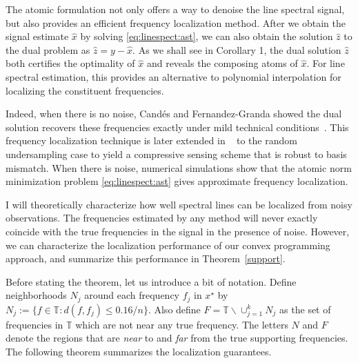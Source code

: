 The atomic formulation not only offers a way to denoise the line spectral
signal, but also provides an efficient frequency localization method. After we
obtain the signal estimate $\hat{x}$ by solving \eqref{eq:linespect:ast}, we can
also obtain the solution $\hat{z}$ to the dual problem as $\hat{z} = y -
\hat{x}$. As we shall see in Corollary 1, the dual solution $\hat{z}$ both
certifies the optimality of $\hat{x}$ and reveals the composing atoms of
$\hat{x}$. For line spectral estimation, this provides an alternative to
polynomial interpolation for localizing the constituent frequencies.

Indeed, when there is no noise, Cand\'es and Fernandez-Granda showed the dual
solution recovers these frequencies exactly under mild technical
conditions~\cite{CandesGranda}. This frequency localization technique is later
extended in ~\cite{offgrid2012} to the random undersampling case to yield a
compressive sensing scheme that is robust to basis mismatch. When there is
noise, numerical simulations show that the atomic norm minimization problem
\eqref{eq:linespect:ast} gives approximate frequency localization.

I will theoretically characterize how well spectral lines can be localized from noisy observations.  The frequencies estimated by any method will never exactly coincide with the true frequencies in the signal in the presence of noise. However, we can characterize the localization performance of our convex programming approach, and summarize this performance in Theorem~\ref{support}.

Before stating the theorem, let us introduce a bit of notation. Define neighborhoods $N_j$ around each frequency $f_j$ in $x^\star$ by $N_j := \{ f \in \mathbb{T} : d(f,f_j) \leq 0.16/n\}$. Also define $F = \mathbb{T}\backslash \cup_{j=1}^k N_j$ as the set of frequencies in $\mathbb{T}$ which are not near any true frequency.  The letters $N$ and $F$ denote the regions that are \emph{near} to and \emph{far} from the true supporting frequencies.  The following theorem summarizes the localization guarantees.


